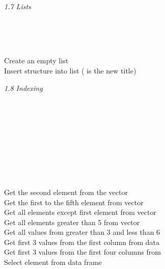 \textit{1.7 Lists} \\
\\
\begin{minipage}[t]{.4\textwidth}
\vspace*{-8pt}
 \\ 				
 \\	
\end{minipage}
\begin{minipage}[t]{.6\textwidth}
Create an empty list   \\
Insert structure  into list  ( is the new title)
\end{minipage}
\vspace*{.5cm}

\textit{1.8 Indexing} \\
\\
\begin{minipage}[t]{.4\textwidth}
\vspace*{-8pt}
 \\				
 \\			
 \\			
 \\				
 \\			 
 \\		
 \\
\end{minipage}
\begin{minipage}[t]{.6\textwidth}
Get the second element from the vector  \\
Get the first to the fifth element from vector  \\
Get all elements except first element from vector  \\
Get all elements greater than 5 from vector  \\
Get all values from  greater than 3 and less than 6 \\
Get first 3 values from the first column from data  \\
Get first 3 values from the first four columns from  \\
Select element  from data frame 
\end{minipage}
\vspace*{.5cm}

